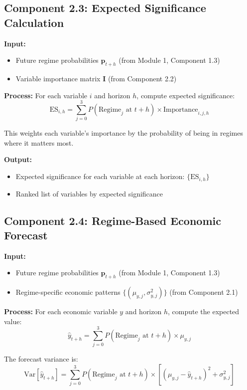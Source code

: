 \documentclass[11pt,a4paper]{article}
\begin{document}
\subsection{Component 2.3: Expected Significance Calculation}

\textbf{Input:}
\begin{itemize}
    \item Future regime probabilities $\mathbf{p}_{t+h}$ (from Module 1, Component 1.3)
    \item Variable importance matrix $\mathbf{I}$ (from Component 2.2)
\end{itemize}

\textbf{Process:}
For each variable $i$ and horizon $h$, compute expected significance:
\begin{equation}
    \text{ES}_{i,h} = \sum_{j=0}^{3} P(\text{Regime}_j \text{ at } t+h) \times \text{Importance}_{i,j,h}
\end{equation}

This weights each variable's importance by the probability of being in regimes where it matters most.

\textbf{Output:}
\begin{itemize}
    \item Expected significance for each variable at each horizon: $\{\text{ES}_{i,h}\}$
    \item Ranked list of variables by expected significance
\end{itemize}

\subsection{Component 2.4: Regime-Based Economic Forecast}

\textbf{Input:}
\begin{itemize}
    \item Future regime probabilities $\mathbf{p}_{t+h}$ (from Module 1, Component 1.3)
    \item Regime-specific economic patterns $\{(\mu_{y,j}, \sigma_{y,j}^2)\}$ (from Component 2.1)
\end{itemize}

\textbf{Process:}
For each economic variable $y$ and horizon $h$, compute the expected value:
\begin{equation}
    \hat{y}_{t+h} = \sum_{j=0}^{3} P(\text{Regime}_j \text{ at } t+h) \times \mu_{y,j}
\end{equation}

The forecast variance is:
\begin{equation}
    \text{Var}[\hat{y}_{t+h}] = \sum_{j=0}^{3} P(\text{Regime}_j \text{ at } t+h) \times \left[(\mu_{y,j} - \hat{y}_{t+h})^2 + \sigma_{y,j}^2\right]
\end{equation}
\end{document}
